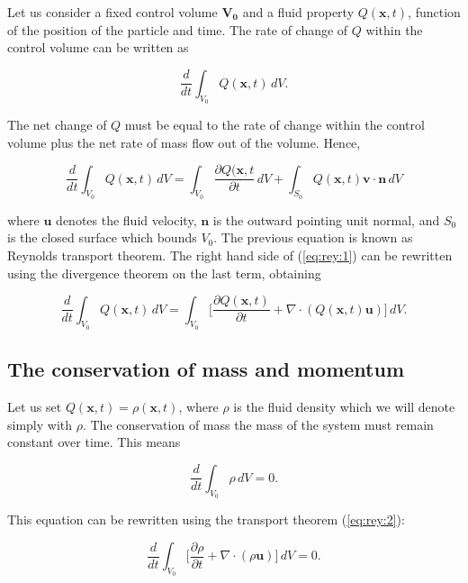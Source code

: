 \documentclass[a4paper,11pt,openright,twoside]{book}
\begin{document}
Let us consider a fixed control volume $\mathbf{V_0}$ and a fluid property $Q(\mathbf{x}, t)$, function of the position of the particle and time. The rate of change of $Q$ within the control volume can be written as

\begin{equation}
\frac{d}{dt} \int_{V_0} Q(\mathbf{x}, t) \, dV.
\end{equation}

The net change of $Q$ must be equal to the rate of change within the control volume plus the net rate of mass flow out of the volume. Hence,


\begin{equation}
\label{eq:rey:1}
\frac{d}{dt} \int_{V_0} Q(\mathbf{x}, t) \, dV = 
\int_{V_0} \frac{\partial Q(\mathbf{x}, t}{\partial t} \, dV +
\int_{S_0} Q(\mathbf{x}, t) \mathbf{v} \cdot \mathbf{n} \, dV
\end{equation}

where $\mathbf{u}$ denotes the fluid velocity, $\mathbf{n}$ is the outward pointing unit normal, and $S_0$ is the closed surface which bounds $V_0$. The previous equation is known as Reynolds transport theorem. The right hand side of (\ref{eq:rey:1}) can be rewritten using the divergence theorem on the last term, obtaining

\begin{equation}
\label{eq:rey:2}
\frac{d}{dt} \int_{V_0} Q(\mathbf{x}, t) \, dV = 
\int_{V_0} \Big[ \frac{\partial Q(\mathbf{x}, t) }{\partial t} + \nabla \cdot (Q(\mathbf{x}, t) \mathbf{\mathbf{u}})   \Big] \, d V.
\end{equation}

\subsection{The conservation of mass and momentum}
Let us set $Q(\mathbf{x}, t) = \rho(\mathbf{x}, t)$, where $\rho$ is the fluid density which we will denote simply with $\rho$. The conservation of mass the mass of the system must remain constant over time. This means

\begin{equation}
\label{eq:rey:3}
\frac{d}{dt} \int_{V_0} \rho  \, dV = 0.
\end{equation}

This equation can be rewritten using the transport theorem (\ref{eq:rey:2}):

\begin{equation}
\label{eq:rey:4}
\frac{d}{dt} \int_{V_0} \Big[ \frac{\partial \rho}{\partial t	} + \nabla \cdot (\rho \mathbf{u}) \Big] \, dV = 0.
\end{equation}
\end{document}
